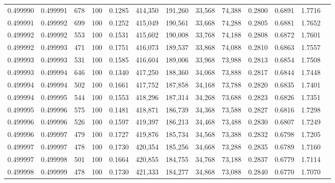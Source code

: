\begin{tabular}{rrrrrrrrrrrrr}
0.499990 & 0.499991 &   678 & 100 &                                     0.1285 & 414,350 & 191,260 &  33,568 &  74,388 & 0.2800 & 0.6891 & 1.7716 \\
0.499991 & 0.499992 &   699 & 100 &                                     0.1252 & 415,049 & 190,561 &  33,668 &  74,288 & 0.2805 & 0.6881 & 1.7652 \\
0.499992 & 0.499992 &   553 & 100 &                                     0.1531 & 415,602 & 190,008 &  33,768 &  74,188 & 0.2808 & 0.6872 & 1.7601 \\
0.499992 & 0.499993 &   471 & 100 &                                     0.1751 & 416,073 & 189,537 &  33,868 &  74,088 & 0.2810 & 0.6863 & 1.7557 \\
0.499993 & 0.499993 &   531 & 100 &                                     0.1585 & 416,604 & 189,006 &  33,968 &  73,988 & 0.2813 & 0.6854 & 1.7508 \\
0.499993 & 0.499994 &   646 & 100 &                                     0.1340 & 417,250 & 188,360 &  34,068 &  73,888 & 0.2817 & 0.6844 & 1.7448 \\
0.499994 & 0.499994 &   502 & 100 &                                     0.1661 & 417,752 & 187,858 &  34,168 &  73,788 & 0.2820 & 0.6835 & 1.7401 \\
0.499994 & 0.499995 &   544 & 100 &                                     0.1553 & 418,296 & 187,314 &  34,268 &  73,688 & 0.2823 & 0.6826 & 1.7351 \\
0.499995 & 0.499996 &   575 & 100 &                                     0.1481 & 418,871 & 186,739 &  34,368 &  73,588 & 0.2827 & 0.6816 & 1.7298 \\
0.499996 & 0.499996 &   526 & 100 &                                     0.1597 & 419,397 & 186,213 &  34,468 &  73,488 & 0.2830 & 0.6807 & 1.7249 \\
0.499996 & 0.499997 &   479 & 100 &                                     0.1727 & 419,876 & 185,734 &  34,568 &  73,388 & 0.2832 & 0.6798 & 1.7205 \\
0.499997 & 0.499997 &   478 & 100 &                                     0.1730 & 420,354 & 185,256 &  34,668 &  73,288 & 0.2835 & 0.6789 & 1.7160 \\
0.499997 & 0.499998 &   501 & 100 &                                     0.1664 & 420,855 & 184,755 &  34,768 &  73,188 & 0.2837 & 0.6779 & 1.7114 \\
0.499998 & 0.499999 &   478 & 100 &                                     0.1730 & 421,333 & 184,277 &  34,868 &  73,088 & 0.2840 & 0.6770 & 1.7070 \\

\end{tabular}
